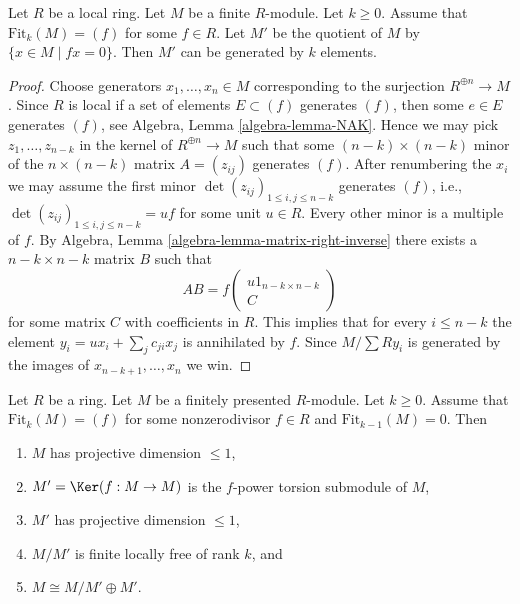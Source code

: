 \begin{lemma}
\label{lemma-principal-fitting-ideal}
Let $R$ be a local ring. Let $M$ be a finite $R$-module. Let $k \geq 0$.
Assume that $\text{Fit}_k(M) = (f)$ for some $f \in R$.
Let $M'$ be the quotient of $M$ by $\{x \in M \mid fx = 0\}$. Then
$M'$ can be generated by $k$ elements.
\end{lemma}

\begin{proof}
Choose generators $x_1, \ldots, x_n \in M$ corresponding to the
surjection $R^{\oplus n} \to M$. Since $R$ is local if a set
of elements $E \subset (f)$ generates $(f)$, then some $e \in E$ generates
$(f)$, see Algebra, Lemma \ref{algebra-lemma-NAK}. Hence we may pick
$z_1, \ldots, z_{n - k}$ in the kernel of $R^{\oplus n} \to M$ such
that some $(n - k) \times (n - k)$ minor of the $n \times (n - k)$
matrix $A = (z_{ij})$ generates $(f)$. After renumbering the $x_i$ we may
assume the first minor $\det(z_{ij})_{1 \leq i, j \leq n - k}$
generates $(f)$, i.e., $\det(z_{ij})_{1 \leq i, j \leq n - k} = uf$
for some unit $u \in R$. Every other minor is a multiple of $f$.
By Algebra, Lemma \ref{algebra-lemma-matrix-right-inverse} there exists a
$n - k \times n - k$ matrix $B$ such that
$$
AB = f
\left(
\begin{matrix}
u 1_{n - k \times n - k} \\
C
\end{matrix}
\right)
$$
for some matrix $C$ with coefficients in $R$. This implies that for every
$i \leq n - k$ the element $y_i = ux_i + \sum_j c_{ji}x_j$ is annihilated
by $f$. Since $M/\sum Ry_i$ is generated by the images of
$x_{n - k + 1}, \ldots, x_n$ we win.
\end{proof}

\begin{lemma}
\label{lemma-fitting-ideals-and-pd1}
Let $R$ be a ring. Let $M$ be a finitely presented $R$-module. Let $k \geq 0$.
Assume that $\text{Fit}_k(M) = (f)$ for some nonzerodivisor $f \in R$
and $\text{Fit}_{k - 1}(M) = 0$. Then
\begin{enumerate}
\item $M$ has projective dimension $\leq 1$,
\item $M' = \Ker(f : M \to M)$ is the $f$-power torsion submodule of $M$,
\item $M'$ has projective dimension $\leq 1$,
\item $M/M'$ is finite locally free of rank $k$, and
\item $M \cong M/M' \oplus M'$.
\end{enumerate}
\end{lemma}

